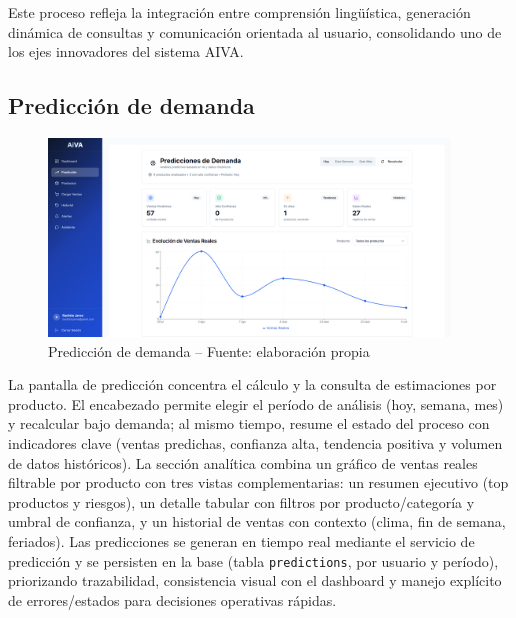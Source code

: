 Este proceso refleja la integración entre comprensión lingüística, generación dinámica de consultas y comunicación orientada al usuario, consolidando uno de los ejes innovadores del sistema AIVA.

\subsection{Predicción de demanda}
\begin{figure}[!htbp]
\centering
\includegraphics[width=0.95\textwidth]{images/prediccionPage.png}
\caption{Predicción de demanda -- Fuente: elaboración propia}
\label{fig:ui-prediccion}
\end{figure}
La pantalla de predicción concentra el cálculo y la consulta de estimaciones por producto. El encabezado permite elegir el período de análisis (hoy, semana, mes) y recalcular bajo demanda; al mismo tiempo, resume el estado del proceso con indicadores clave (ventas predichas, confianza alta, tendencia positiva y volumen de datos históricos). La sección analítica combina un gráfico de ventas reales filtrable por producto con tres vistas complementarias: un resumen ejecutivo (top productos y riesgos), un detalle tabular con filtros por producto/categoría y umbral de confianza, y un historial de ventas con contexto (clima, fin de semana, feriados). Las predicciones se generan en tiempo real mediante el servicio de predicción y se persisten en la base (tabla \texttt{predictions}, por usuario y período), priorizando trazabilidad, consistencia visual con el dashboard y manejo explícito de errores/estados para decisiones operativas rápidas.

